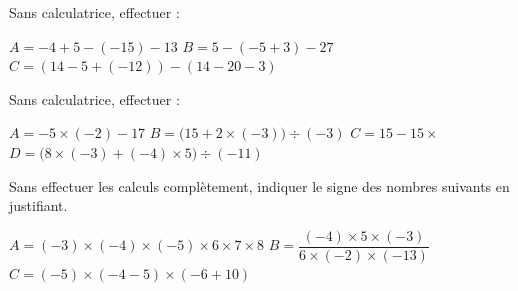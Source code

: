 \documentclass[a4paper]{book}
\begin{document}
    \begin{exercice}
        Sans calculatrice, effectuer : 

        $A=-4+5-(-15)-13$ \quad $B=5-(-5+3)-27$ \quad $C=(14-5+(-12))-(14-20-3)$
    \end{exercice}


    \begin{exercice}
        Sans calculatrice, effectuer :

        $A=-5\times(-2)-17$ \quad
        $B=\big(15+2\times(-3)\big)\div(-3)$ \quad 
        $C=15-15\times$ \quad
        $D=\big(8\times(-3)+(-4)\times5\big)\div(-11)$
    \end{exercice}


    \begin{exercice}
        Sans effectuer les calculs complètement, indiquer le signe des nombres suivants en justifiant.

        \medskip

        $A=(-3)\times(-4)\times(-5)\times6\times7\times8$ \quad
        $B=\dfrac{(-4)\times5\times(-3)}{6\times(-2)\times(-13)}$ \quad 
        $C=(-5)\times(-4-5)\times(-6+10)$  
    \end{exercice}
\end{document}
